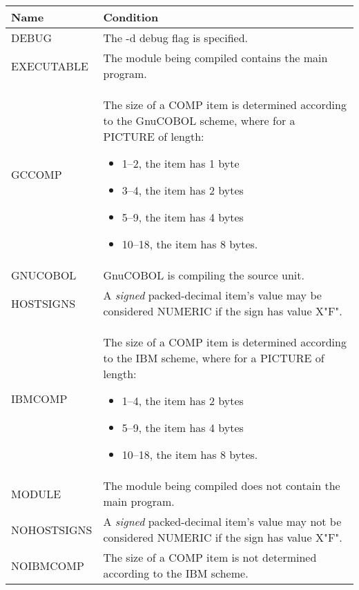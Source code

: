 \begin{centering}
  \begin{longtable}[!h]{p{} p{}}
    \toprule
    \textbf{Name} & \textbf{Condition} \\

    \midrule
    DEBUG & The -d debug flag is specified. \\

    EXECUTABLE & The module being compiled contains the main program. \\

    GCCOMP & The size of a COMP item is determined according to the GnuCOBOL scheme, where for a PICTURE of length:
    \begin{itemize}
    \item 1--2, the item has 1 byte
    \item 3--4, the item has 2 bytes
    \item 5--9, the item has 4 bytes
    \item 10--18, the item has 8 bytes.
    \end{itemize} \\

    GNUCOBOL & GnuCOBOL is compiling the source unit. \\

    HOSTSIGNS & A \emph{signed} packed-decimal item's value may be considered NUMERIC if the sign has value X"F". \\

    IBMCOMP & The size of a COMP item is determined according to the IBM scheme, where for a PICTURE of length:
    \begin{itemize}
    \item 1--4, the item has 2 bytes
    \item 5--9, the item has 4 bytes
    \item 10--18, the item has 8 bytes.
    \end{itemize} \\

    MODULE & The module being compiled does not contain the main program. \\

    NOHOSTSIGNS & A \emph{signed} packed-decimal item's value may not be considered NUMERIC if the sign has value X"F". \\

    NOIBMCOMP & The size of a COMP item is not determined according to the IBM scheme. \\


\end{longtable}
\end{centering}
